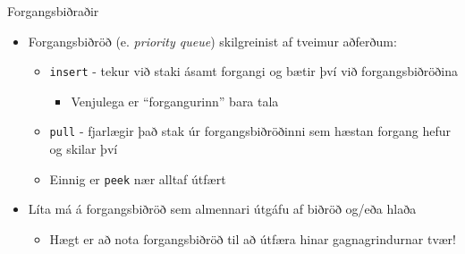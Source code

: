 \documentclass{beamer}
\begin{document}
\begin{frame}{Forgangsbiðraðir}
\begin{itemize}
 \item Forgangsbiðröð (e. \emph{priority queue}) skilgreinist af tveimur aðferðum:
 \begin{itemize}
  \item \texttt{insert} - tekur við staki ásamt forgangi og bætir því við forgangsbiðröðina
  \begin{itemize}
   \item Venjulega er ``forgangurinn'' bara tala
  \end{itemize}
  \item \texttt{pull} - fjarlægir það stak úr forgangsbiðröðinni sem hæstan forgang hefur og skilar því
  \item Einnig er \texttt{peek} nær alltaf útfært
 \end{itemize}
 \item Líta má á forgangsbiðröð sem almennari útgáfu af biðröð og/eða hlaða
 \begin{itemize}
  \item Hægt er að nota forgangsbiðröð til að útfæra hinar gagnagrindurnar tvær!
 \end{itemize}
\end{itemize}
\end{frame}
\end{document}
